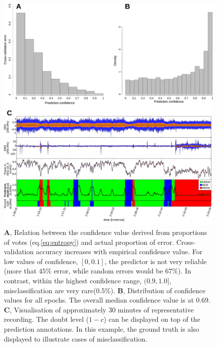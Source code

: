\begin{figure}[h!]
  \centering    
    \includegraphics[width=1.0\textwidth]{figures/error.pdf}
    \caption{
    \textbf{A}, Relation between the confidence value derived from proportions of votes (eq.\ref{eq:entropy}) and actual proportion of error.
    Cross-validation accuracy increases with empirical confidence value.
    For low values of confidence, $[0, 0.1]$, the predictor is not very reliable (more that $45\%$ error, while random errors would be $67\%$).
    In contrast, within the highest confidence range, $(0.9, 1.0]$, misclassification are very rare($0.5 \%$).
    \textbf{B}, Distribution of confidence values for all epochs. The overall median confidence value is at 0.69.
    \textbf{C}, Visualisation of approximately 30 minutes of representative recording.
    The doubt level ($1 - c$) can be displayed on top of the prediction annotations.
    In this example, the ground truth is also displayed to illustrate cases of misclassification.
    \label{fig:error}
  }
\end{figure}
